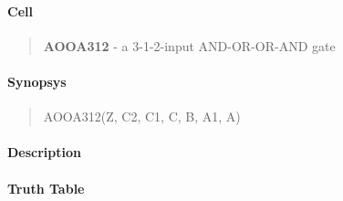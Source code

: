 \label{AOOA312}
\paragraph{Cell}
\begin{quote}
    \textbf{AOOA312} - a 3-1-2-input AND-OR-OR-AND gate
\end{quote}

\paragraph{Synopsys}
\begin{quote}
    AOOA312(Z, C2, C1, C, B, A1, A)
\end{quote}

\paragraph{Description}

%

\paragraph{Truth Table}
%

